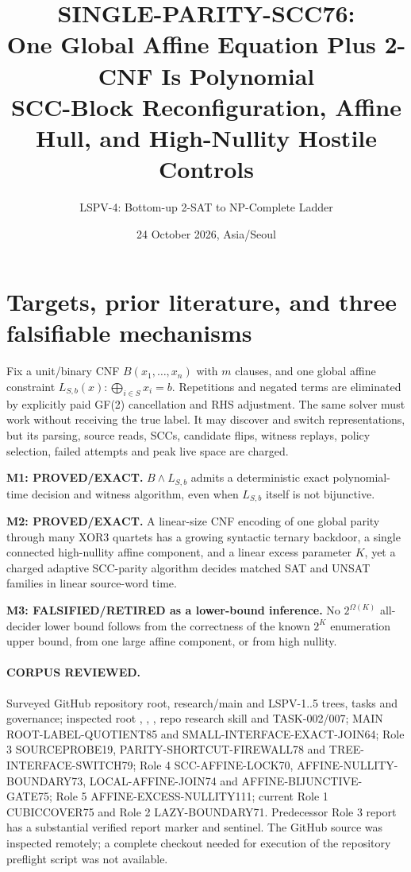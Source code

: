 \documentclass[11pt]{article}
\title{SINGLE-PARITY-SCC76:\\ One Global Affine Equation Plus 2-CNF Is Polynomial\\ \large SCC-Block Reconfiguration, Affine Hull, and High-Nullity Hostile Controls}
\author{LSPV-4: Bottom-up 2-SAT to NP-Complete Ladder}
\date{24 October 2026, Asia/Seoul}
\begin{document}
\maketitle
\begin{center}\end{center}

\section{Targets, prior literature, and three falsifiable mechanisms}
Fix a unit/binary CNF $B(x_1,\ldots,x_n)$ with $m$ clauses, and one global affine constraint $L_{S,b}(x):\bigoplus_{i\in S}x_i=b$. Repetitions and negated terms are eliminated by explicitly paid GF(2) cancellation and RHS adjustment. The same solver must work without receiving the true label. It may discover and switch representations, but its parsing, source reads, SCCs, candidate flips, witness replays, policy selection, failed attempts and peak live space are charged.

\noindent\textbf{M1: PROVED/EXACT.} $B\wedge L_{S,b}$ admits a deterministic exact polynomial-time decision and witness algorithm, even when $L_{S,b}$ itself is not bijunctive.
\par\noindent\textbf{M2: PROVED/EXACT.} A linear-size CNF encoding of one global parity through many XOR3 quartets has a growing syntactic ternary backdoor, a single connected high-nullity affine component, and a linear excess parameter $K$, yet a charged adaptive SCC-parity algorithm decides matched SAT and UNSAT families in linear source-word time.
\par\noindent\textbf{M3: FALSIFIED/RETIRED as a lower-bound inference.} No $2^{\Omega(K)}$ all-decider lower bound follows from the correctness of the known $2^K$ enumeration upper bound, from one large affine component, or from high nullity.

\paragraph{CORPUS REVIEWED.}
Surveyed GitHub repository root, research/main and LSPV-1..5 trees, tasks and governance; inspected root , , , repo research skill and TASK-002/007; MAIN ROOT-LABEL-QUOTIENT85 and SMALL-INTERFACE-EXACT-JOIN64; Role 3 SOURCEPROBE19, PARITY-SHORTCUT-FIREWALL78 and TREE-INTERFACE-SWITCH79; Role 4 SCC-AFFINE-LOCK70, AFFINE-NULLITY-BOUNDARY73, LOCAL-AFFINE-JOIN74 and AFFINE-BIJUNCTIVE-GATE75; Role 5 AFFINE-EXCESS-NULLITY111; current Role 1 CUBICCOVER75 and Role 2 LAZY-BOUNDARY71. Predecessor Role 3 report has a substantial verified report marker and sentinel. The GitHub source was inspected remotely; a complete checkout needed for execution of the repository preflight script was not available.
\end{document}
